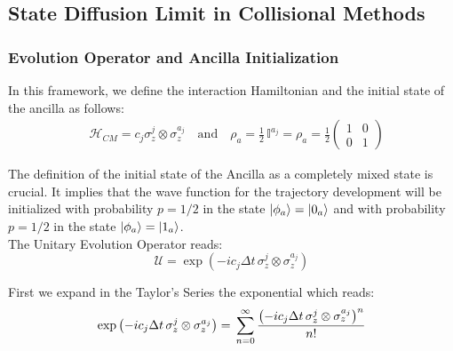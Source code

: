 \documentclass[a4paper,12pt]{article}
\begin{document}
	\clearpage
	\newpage

	\subsection{State Diffusion Limit in Collisional Methods}
	\label{sec:State Diffusion_Limit_in_Collisional_Methods}

	\subsubsection{Evolution Operator and Ancilla Initialization}
	\label{sub:Evolution_Operator_and_Ancilla_Initialization_Diff}

	In this framework, we define the interaction Hamiltonian and the initial state of the ancilla as follows:
	\begin{align}
		&\mathcal{H}_{CM} = c_{j} \sigma_{z}^{j} \otimes \sigma_{z}^{a_j} \quad \text{and} \quad \rho_{a} = \frac{1}{2} \, \mathbb{I}^{a_j} =\rho_{a} = \frac{1}{2} \begin{pmatrix} 1 & 0 \\ 0 & 1 \end{pmatrix}
		\label{eq:Diff_initialization}
	\end{align}

	The definition of the initial state of the Ancilla as a completely mixed state is crucial. It implies that the wave function for the trajectory development will be initialized with probability $p=1/2$ in the state $ \ket{\phi_a} = \ket{0_a} $ and with probability $p=1/2$ in the state $ \ket{\phi_a} = \ket{1_a} $. \\

	The Unitary Evolution Operator reads:
	\begin{equation}
		\mathcal{U} = \exp{\left( -i c_j \Delta t \, \sigma_{z}^{j} \otimes \sigma_{z}^{a_j} \right)}
		\label{eq:U_Diff}
	\end{equation}

	First we expand in the Taylor's Series the exponential which reads:
	\begin{equation}
		\exp{\left( -i c_j \Delta t \, \sigma_{z}^{j} \otimes \sigma_{z}^{a_j} \right)} = \, \sum_{n=0}^{\infty}{\frac{\left( -i c_j \Delta t \, \sigma_{z}^{j} \otimes \sigma_{z}^{a_j} \right)^n}{n!} } \\
		\label{eq:exp_decomposition}
	\end{equation}
\end{document}
